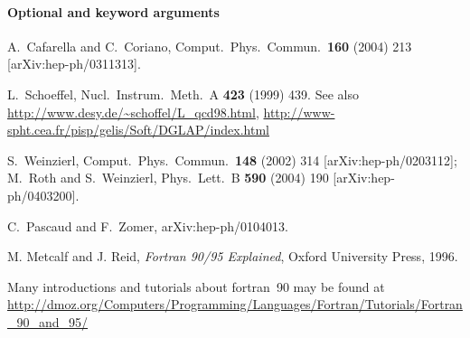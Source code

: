 \documentclass[12pt]{article}
\begin{document}
\paragraph{Optional and keyword arguments}

\begin{thebibliography}{99}

 A.~Cafarella and C.~Coriano,
Comput.\ Phys.\ Commun.\  {\bf 160} (2004) 213
[arXiv:hep-ph/0311313].

L.~Schoeffel,
Nucl.\ Instrum.\ Meth.\ A {\bf 423} (1999) 439.
See also \url{http://www.desy.de/~schoffel/L_qcd98.html},
\url{http://www-spht.cea.fr/pisp/gelis/Soft/DGLAP/index.html}


S.~Weinzierl,
Comput.\ Phys.\ Commun.\  {\bf 148} (2002) 314
[arXiv:hep-ph/0203112];
M.~Roth and S.~Weinzierl,
Phys.\ Lett.\ B {\bf 590} (2004) 190
[arXiv:hep-ph/0403200].



C.~Pascaud and F.~Zomer,
arXiv:hep-ph/0104013.

  M. Metcalf and J. Reid, \emph{Fortran 90/95 Explained}, Oxford
  University Press, 1996.

 Many introductions and tutorials about
  fortran~90 may be found at
  \url{http://dmoz.org/Computers/Programming/Languages/Fortran/Tutorials/Fortran_90_and_95/}

\end{thebibliography}
\end{document}
